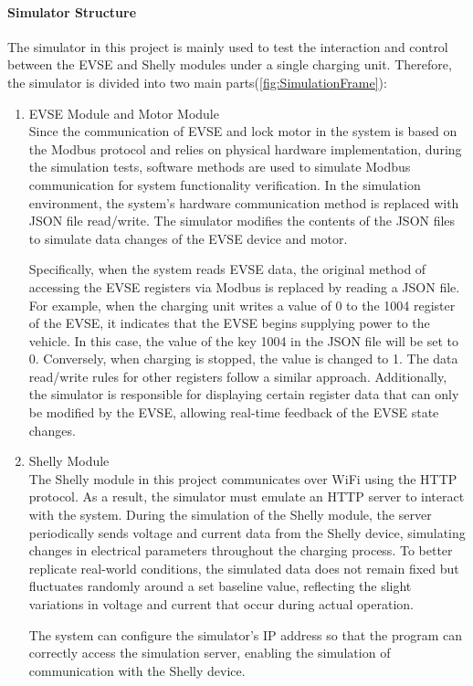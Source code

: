 \documentclass[
english,
ruledheaders=section,%
class=report,%
thesis={type=Report},%
accentcolor=9c,%
custommargins=true,%
marginpar=false,%
parskip=half-,%
fontsize=11pt,%
logofile={img/tuda_logo.pdf}, %
]{tudapub}
\begin{document}

        \paragraph{Simulator Structure}
        The simulator in this project is mainly used to test the interaction and control between the EVSE and Shelly modules under a single charging unit. Therefore, the simulator is divided into two main parts(\autoref{fig:SimulationFrame}):
        \begin{enumerate}
            \item EVSE Module and Motor Module\\
            Since the communication of EVSE and lock motor in the system is based on the Modbus protocol and relies on physical hardware implementation, during the simulation tests, software methods are used to simulate Modbus communication for system functionality verification. In the simulation environment, the system's hardware communication method is replaced with JSON file read/write. The simulator modifies the contents of the JSON files to simulate data changes of the EVSE device and motor.

            Specifically, when the system reads EVSE data, the original method of accessing the EVSE registers via Modbus is replaced by reading a JSON file. For example, when the charging unit writes a value of 0 to the 1004 register of the EVSE, it indicates that the EVSE begins supplying power to the vehicle. In this case, the value of the key 1004 in the JSON file will be set to 0. Conversely, when charging is stopped, the value is changed to 1. The data read/write rules for other registers follow a similar approach. Additionally, the simulator is responsible for displaying certain register data that can only be modified by the EVSE, allowing real-time feedback of the EVSE state changes.

            \item Shelly Module\\
            The Shelly module in this project communicates over WiFi using the HTTP protocol. As a result, the simulator must emulate an HTTP server to interact with the system. During the simulation of the Shelly module, the server periodically sends voltage and current data from the Shelly device, simulating changes in electrical parameters throughout the charging process. To better replicate real-world conditions, the simulated data does not remain fixed but fluctuates randomly around a set baseline value, reflecting the slight variations in voltage and current that occur during actual operation.

            The system can configure the simulator's IP address so that the program can correctly access the simulation server, enabling the simulation of communication with the Shelly device.
        \end{enumerate}
\end{document}
